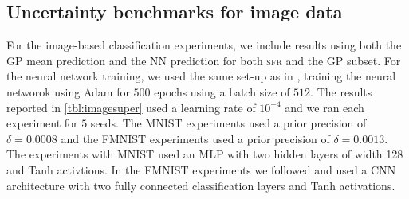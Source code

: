 \documentclass{article}
\newcommand{\our}{\textsc{sfr}\xspace}
\begin{document}
\subsection{Uncertainty benchmarks for image data}
\label{app:image}

For the image-based classification experiments,
we include results using both the GP mean prediction and the NN prediction for both \our and the GP subset.
For the neural network training, we used the same set-up as in \citet{immer2021improving},
training the neural networok using Adam for $500$ epochs using a batch size of $512$.
The results reported in \cref{tbl:imagesuper} used a learning rate of $10^{-4}$
and we ran each experiment for $5$ seeds.
The MNIST experiments used a prior precision of $\delta=0.0008$
and the FMNIST experiments used a prior precision of $\delta=0.0013$.
The experiments with MNIST  used an MLP with two hidden layers of width 128 and Tanh activtions.
In the FMNIST experiments we followed \cite{immer2021improving} and used a CNN
architecture with two fully connected classification layers and Tanh activations.
\end{document}
